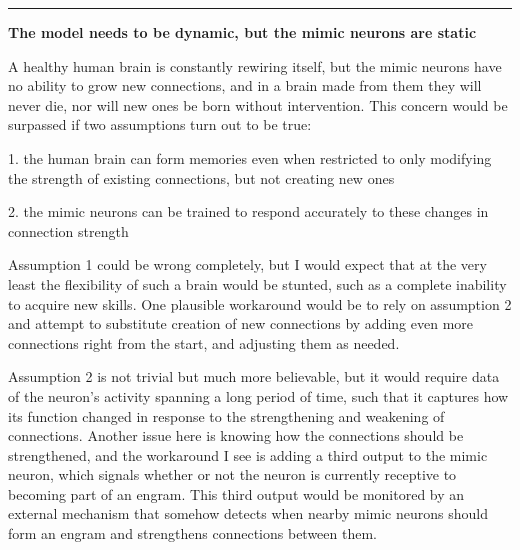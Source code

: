 \documentclass[a4paper]{article}
\begin{document}
	\noindent\rule{\linewidth}{0.5pt}
	
	\begin{center}
		\textbf{The model needs to be dynamic, but the mimic neurons are static}
	\end{center}
	
	A healthy human brain is constantly rewiring itself, but the mimic neurons have no ability to grow new connections, and in a brain made from them they will never die, nor will new ones be born without intervention. This concern would be surpassed if two assumptions turn out to be true:
	
	\medskip
	
	1. the human brain can form memories even when restricted to only modifying the strength of existing connections, but not creating new ones
	
	\medskip
	
	2. the mimic neurons can be trained to respond accurately to these changes in connection strength
	
	\bigskip
	
	Assumption 1 could be wrong completely, but I would expect that at the very least the flexibility of such a brain would be stunted, such as a complete inability to acquire new skills. One plausible workaround would be to rely on assumption 2 and attempt to substitute creation of new connections by adding even more connections right from the start, and adjusting them as needed.
	
	\medskip
	
	Assumption 2 is not trivial but much more believable, but it would require data of the neuron's activity spanning a long period of time, such that it captures how its function changed in response to the strengthening and weakening of connections. Another issue here is knowing how the connections should be strengthened, and the workaround I see is adding a third output to the mimic neuron, which signals whether or not the neuron is currently receptive to becoming part of an engram. This third output would be monitored by an external mechanism that somehow detects when nearby mimic neurons should form an engram and strengthens connections between them.
	
	\medskip
    
\end{document}
